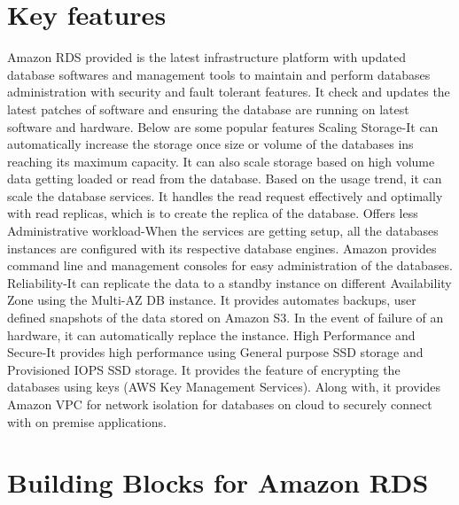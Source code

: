 \section{Key features}
Amazon RDS provided is the latest infrastructure platform with updated 
database softwares and management tools to maintain and perform databases 
administration with security and fault tolerant features. It check and 
updates the latest patches of software and ensuring the database are 
running on latest software and hardware.
Below are some popular features 
Scaling Storage-It can automatically increase the storage once size or 
volume of the databases ins reaching its maximum capacity. It can also 
scale storage based on high volume data getting loaded or read 
from the database. Based on the usage trend, it can scale the database 
services. It handles the read request effectively and optimally with read 
replicas, which is to create the replica of the database. 
Offers less Administrative workload-When the services are getting setup, 
all the databases instances are configured with its respective database engines. 
Amazon provides command line and management consoles for easy administration 
of the databases.
Reliability-It can replicate the data to a standby instance on different 
Availability Zone using the Multi-AZ DB instance. It provides  automates 
backups, user defined snapshots of the data stored on Amazon S3. In the event 
of failure of an hardware, it can automatically replace the instance.
High Performance and Secure-It provides high performance using General 
purpose SSD storage and Provisioned IOPS SSD storage. It provides the feature 
of encrypting the databases using keys (AWS Key Management Services). 
Along with, it provides Amazon VPC for network isolation for databases on 
cloud to securely connect with on premise applications.
 

\section{Building Blocks for Amazon RDS}

